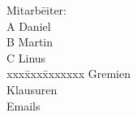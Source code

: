 \documentclass{article}
\begin{document}
\begin{tabbing}
Mitarb\=eiter:\\
A  \> Daniel\\
B  \> Martin\\
C  \> Linus\\
xxx\=xxx\=xxxxxxx\kill
\> Gremien\\
\>\> Klausuren\\
\>\> Emails\\
\end{tabbing}
\end{document}
